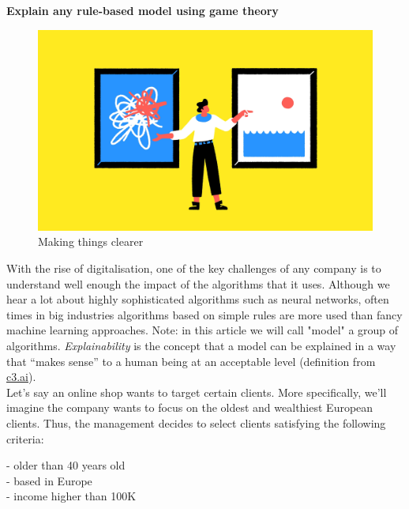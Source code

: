 {\fontsize{35pt}{50pt} \textbf{Explain any rule-based model using game theory}\par}

\vspace{10mm}

\begin{figure}[h]
\begin{center}
\includegraphics[scale=0.223]{./../img/make-things-clearer.png}
\caption{Making things clearer}
\end{center}
\end{figure}

With the rise of digitalisation, one of the key challenges of any company is to understand well enough the impact of the algorithms that it uses. Although we hear a lot about highly sophisticated algorithms such as neural networks, often times in big industries algorithms based on simple rules are more used than fancy machine learning approaches. Note: in this article we will call "model" a group of algorithms. \textit{Explainability} is the concept that a model can be explained in a way that “makes sense” to a human being at an acceptable level (definition from \href{https://c3.ai/glossary/machine-learning/explainability/}{c3.ai}). \\

Let's say an online shop wants to target certain clients. More specifically, we'll imagine the company wants to focus on the oldest and wealthiest European clients. Thus, the management decides to select clients satisfying the following criteria: 

- older than 40 years old \\
- based in Europe \\
- income higher than 100K \\

